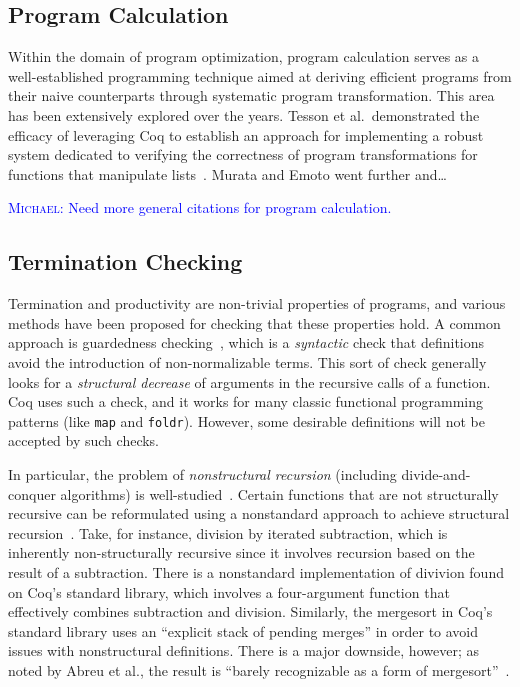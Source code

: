 \documentclass[anonymous, a4paper, UKenglish, cleveref, autoref, thm-restate]{lipics-v2021}
\newcommand{\mvol}[1]{\textcolor{blue}{\textsc{Michael}: #1}}
\newcommand{\haskell}[1]{\texttt{#1}}
\begin{document}
\subsection{Program Calculation}

Within the domain of program optimization, program calculation serves as a
well-established programming technique aimed at deriving efficient programs from
their naive counterparts through systematic program transformation. This area
has been extensively explored over the years. Tesson et al.\ demonstrated the
efficacy of leveraging Coq to establish an approach for implementing a robust
system dedicated to verifying the correctness of program transformations for
functions that manipulate lists~\cite{10.1007/978-3-642-17796-5_10}. Murata and
Emoto went further and\ldots~\cite{MurataE19}

\mvol{Need more general citations for program calculation.}

\subsection{Termination Checking}

Termination and productivity are non-trivial properties of programs, and various
methods have been proposed for checking that these properties hold. A common
approach is guardedness checking~\cite{10.5555/646535.695850}, which is a
\emph{syntactic} check that definitions avoid the introduction of
non-normalizable terms. This sort of check generally looks for a
\emph{structural decrease} of arguments in the recursive calls of a function.
Coq uses such a check, and it works for many classic functional programming
patterns (like \haskell{map} and \haskell{foldr}). However, some desirable
definitions will not be accepted by such checks.

In particular, the problem of \emph{nonstructural recursion} (including
divide-and-conquer algorithms) is well-studied~\cite{BOVE_KRAUSS_SOZEAU_2016}.
Certain functions that are not structurally recursive can be reformulated using
a nonstandard approach to achieve structural recursion~\cite{AbreuDHJMS23}.
Take, for instance, division by iterated subtraction, which is inherently
non-structurally recursive since it involves recursion based on the result of a
subtraction. There is a nonstandard implementation of divivion found on Coq's
standard library, which involves a four-argument function that effectively
combines subtraction and division. Similarly, the mergesort in Coq's standard
library uses an ``explicit stack of pending merges'' in order to avoid issues
with nonstructural definitions. There is a major downside, however; as noted by
Abreu et al., the result is ``barely recognizable as a form of
mergesort''~\cite{AbreuDHJMS23}.
\end{document}
